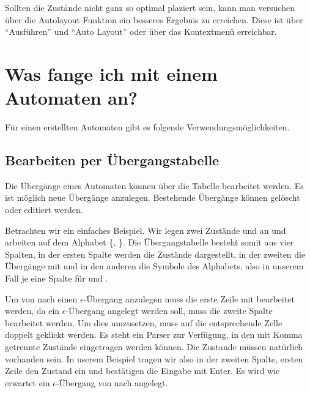 Sollten die Zustände nicht ganz so optimal plaziert sein, kann man
versuchen über die Autolayout Funktion ein besseres Ergebnis zu
erreichen. Diese ist über "`Ausführen"' und "`Auto Layout"' oder über
das Kontextmenü erreichbar.

\section{Was fange ich mit einem Automaten an?}

Für einen erstellten Automaten gibt es folgende
Ver\-wen\-dungs\-möglich\-keiten.


\subsection{Bearbeiten per Übergangstabelle}

Die Übergänge eines Automaten können über die Tabelle bearbeitet werden. Es ist
möglich neue Übergänge anzulegen. Bestehende Übergänge können gelöscht oder
editiert werden.\vspace{10pt}

Betrachten wir ein einfaches Beispiel. Wir legen zwei Zustände  und
 an und arbeiten auf dem Alphabet \{, \}. Die
Übergangstabelle besteht somit aus vier Spalten, in der ersten Spalte werden die
Zustände dargestellt, in der zweiten die Übergänge mit \Symbol{$\epsilon$} und in
den anderen die Symbole des Alphabets, also in unserem Fall je eine Spalte für
 und .\vspace{10pt}

Um von  nach  einen $\epsilon$-Übergang anzulegen muss die
erste Zeile mit  bearbeitet werden, da ein $\epsilon$-Übergang angelegt
werden soll, muss die zweite Spalte bearbeitet werden. Um dies umzusetzen, muss
auf die entsprechende Zelle doppelt geklickt werden. Es steht ein Parser zur
Verfügung, in den mit Komma getrennte Zustände eingetragen werden können. Die
Zustande müssen natürlich vorhanden sein. In userem Beispiel tragen wir also in
der zweiten Spalte, ersten Zeile den Zustand  ein und bestätigen die
Eingabe mit Enter. Es wird wie erwartet ein $\epsilon$-Übergang von 
nach  angelegt.\vspace{10pt}

